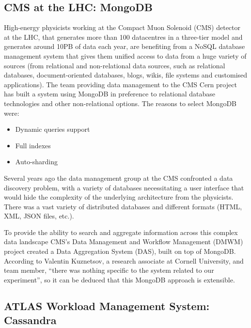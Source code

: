 \subsection{CMS at the LHC: MongoDB} %
\label{sub:cms_at_the_lhc_mongodb}
High-energy physicists working at the Compact Muon Solenoid (CMS) detector at the LHC, that generates more than 100 datacentres in a three-tier model and generates around 10PB of data each year, are benefiting from a NoSQL database management system that gives them unified access to data from a huge variety of sources (from relational and non-relational data sources, such as relational databases, document-oriented databases, blogs, wikis, file systems and customised applications). The team providing data management to the CMS Cern project has built a system using MongoDB in preference to relational database technologies and other non-relational options. The reasons to select MongoDB were:

\begin{itemize}
\item Dynamic queries support
\item Full indexes
\item Auto-sharding
\end{itemize}

Several years ago the data management group at the CMS confronted a data discovery problem, with a variety of databases necessitating a user interface that would hide the complexity of the underlying architecture from the physicists. There was a vast variety of distributed databases and different formats (HTML, XML, JSON files, etc.).

To provide the ability to search and aggregate information across this complex data landscape CMS's Data Management and Workflow Management (DMWM) project created a
Data Aggregation System (DAS),
built on
top of
MongoDB.  According to Valentin Kuznetsov, a research associate at Cornell University, and team member, ``there was nothing specific to the system related to our experiment'', so it can be deduced that this MongoDB approach is extensible. 


\subsection{ATLAS Workload Management System: Cassandra} %
\label{sub:atlas_workload_management_system_cassandra}

